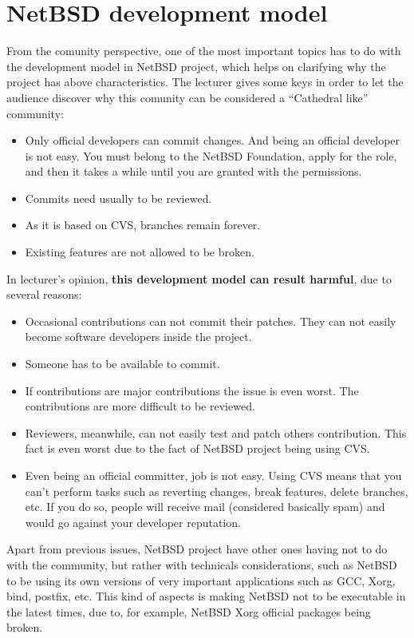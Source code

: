 \documentclass[11pt]{article}
\begin{document}
\section{NetBSD development model}
From the comunity perspective, one of the most important topics has to do with the development model in NetBSD project, which helps on clarifying why the project has above characteristics. The lecturer gives some keys in order to let the audience discover why this comunity can be considered a ``Cathedral like'' community:
\begin{itemize}\itemsep0pt
\item{Only official developers can commit changes}. And being an official developer is not easy. You must belong to the NetBSD Foundation, apply for the role, and then it takes a while until you are granted with the permissions.
\item{Commits need usually to be reviewed}.
\item{As it is based on CVS, branches remain forever}.
\item{Existing features are not allowed to be broken}.
\end{itemize}
In lecturer's opinion, \textbf{this development model can result harmful}, due to several reasons:
\begin{itemize}
\item{Occasional contributions can not commit their patches}. They can not easily become software developers inside the project.
\item{Someone has to be available to commit}.
\item{If contributions are major contributions the issue is even worst}. The contributions are more difficult to be reviewed.
\item{Reviewers, meanwhile, can not easily test and patch others contribution}. This fact is even worst due to the fact of NetBSD project being using CVS.
\item{Even being an official committer, job is not easy}. Using CVS means that you can't perform tasks such as reverting changes, break features, delete branches, etc. If you do so, people will receive mail (considered basically spam) and would go against your developer reputation.
\end{itemize}
Apart from previous issues, NetBSD project have other ones having not to do with the community, but rather with technicals considerations, such as NetBSD to be using its own versions of very important applications such as GCC, Xorg, bind, postfix, etc. This kind of aspects is making NetBSD not to be executable in the latest times, due to, for example, NetBSD Xorg official packages being broken.
\end{document}
